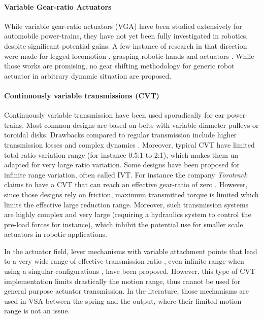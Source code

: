 
\paragraph{Variable Gear-ratio Actuators} 
While variable gear-ratio actuators (VGA) have been studied extensively for automobile power-trains, they have not yet been fully investigated in robotics, despite significant potential gains. A few instance of research in that direction were made for legged locomotion \cite{hirose_design_1991}, grasping robotic hands \cite{shin_robot_2012} and actuators \cite{hirose_development_1999} \cite{byeong-sang_kim_improved_2007}\cite{tahara_high-backdrivable_2011}. While those works are promising, no gear shifting methodology for generic robot actuator in arbitrary dynamic situation are proposed.


\paragraph{Continuously variable transmissions (CVT)} 

Continuously variable transmission have been used sporadically for car power-trains. Most common designs are based on belts with variable-diameter pulleys or toroidal disks. Drawbacks compared to regular transmission include higher transmission losses and complex dynamics \cite{srivastava_review_2009}. Moreover, typical CVT have limited total ratio variation range (for instance 0.5:1 to 2:1), which makes them un-adapted for very large ratio variation. Some designs have been proposed for infinite range variation, often called IVT. For instance the company \textit{Torotrack} claims to have a CVT that can reach an effective gear-ratio of zero \cite{schoolcraft_gear_2011}. However, since those designs rely on friction, maximum transmitted torque is limited which limits the effective large reduction range. Moreover, such transmission systems are highly complex and very large (requiring a hydraulics system to control the pre-load forces for instance), which inhibit the potential use for smaller scale actuators in robotic applications. 


In the actuator field, lever mechanisms with variable attachment points that lead to a very wide range of effective transmission ratio \cite{tahara_high-backdrivable_2011}, even infinite range when using a singular configurations \cite{jafari_new_2014}, have been proposed. However, this type of CVT implementation limits drastically the motion range, thus cannot be used for general purpose actuator transmission. In the literature, those mechanisms are used in VSA between the spring and the output, where their limited motion range is not an issue. 

